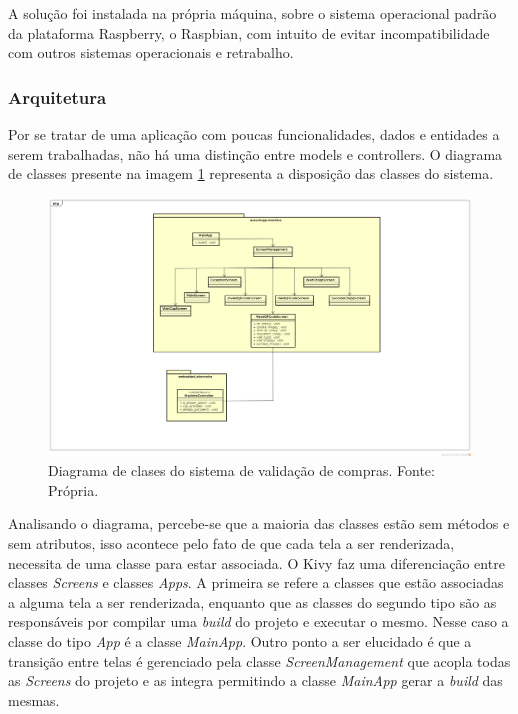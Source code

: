 A solução foi instalada na própria máquina, sobre o sistema operacional padrão
da plataforma Raspberry, o Raspbian, com intuito de evitar incompatibilidade com outros
sistemas operacionais e retrabalho.

\subsubsection[Arquitetura]{Arquitetura}
Por se tratar de uma aplicação com poucas funcionalidades, dados e entidades a serem trabalhadas,
não há uma distinção entre models e controllers. O diagrama de classes presente na imagem 
\ref{classes-kivy} representa a disposição das classes do sistema.

\begin{figure}[!htb]
    \centering
    \includegraphics[scale= 0.3]{figuras/autochopp-machine-diagrama.png}        
    \caption{Diagrama de clases do sistema de validação de compras. Fonte: Própria.}
    \label{classes-kivy}
\end{figure}

Analisando o diagrama, percebe-se que a maioria das classes estão sem métodos e sem atributos,
isso acontece pelo fato de que cada tela a ser renderizada, necessita de uma classe para estar
associada. O Kivy faz uma diferenciação entre classes \textit{Screens} e classes \textit{Apps}.
A primeira se refere a classes que estão associadas a alguma tela a ser renderizada, enquanto
que as classes do segundo tipo são as responsáveis por compilar uma \textit{build} do projeto
e executar o mesmo. Nesse caso a classe do tipo \textit{App} é a classe \textit{MainApp}. Outro
ponto a ser elucidado é que a transição entre telas é gerenciado pela classe
\textit{ScreenManagement} que acopla todas as \textit{Screens} do projeto e as integra permitindo
a classe \textit{MainApp} gerar a \textit{build} das mesmas.

